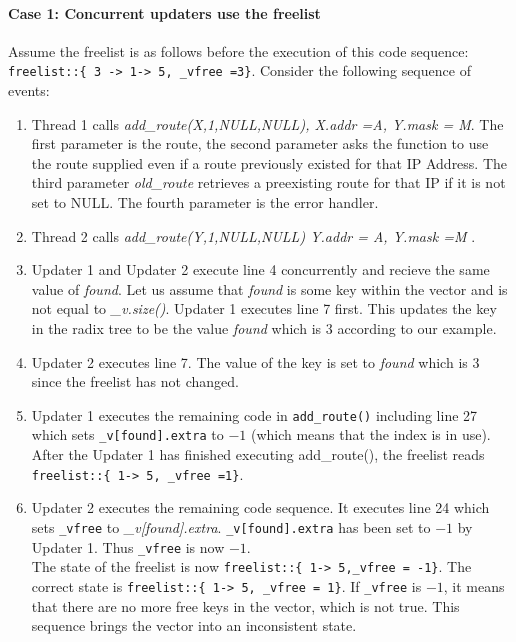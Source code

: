 \documentclass[a4paper,marginparwidth=50pt,marginparsep=10pt]{article}
\begin{document}
\paragraph{Case 1: Concurrent updaters use the freelist}
Assume the freelist is as follows before the execution of this code sequence:\\
\verb$freelist::{ 3 -> 1-> 5, _vfree =3}$. Consider the following sequence of events:
\begin{enumerate}
\item Thread 1 calls \emph{add\_route(X,1,NULL,NULL), X.addr =A, Y.mask = M}. The first parameter is the route, the second parameter asks the function to use the route supplied even if a route previously existed for that IP Address. The third parameter \emph{old\_route} retrieves a preexisting route for that IP if it is not set to NULL. The fourth parameter is the error handler.
\item Thread 2 calls \emph{add\_route(Y,1,NULL,NULL) Y.addr = A, Y.mask =M} .
\item Updater 1 and Updater 2 execute line 4 concurrently and recieve the same value of \emph{found}. Let us assume that \emph{found} is some key within the vector and is not equal to \emph{\_v.size()}. Updater 1 executes line 7 first. This updates the key in the radix tree to be the value \emph{found} which is $3$ according to our example.
\item Updater 2 executes line 7. The value of the key is set to \emph{found} which is $3$ since the freelist has not changed.
\item Updater 1 executes the remaining code in \verb+add_route()+ including line 27 which sets  \verb+_v[found].extra+ to $-1$ (which means that the index is in use). After the Updater 1 has finished executing add\_route(), the freelist reads 
\verb$freelist::{ 1-> 5, _vfree =1}$.
\item Updater 2 executes the remaining code sequence. It executes line 24 which sets \verb+_vfree+ to \emph{\_v[found].extra}. \verb+_v[found].extra+ has been set to $-1$ by Updater 1. Thus \verb+_vfree+ is now $-1$.\\
The state of the freelist is now \verb$freelist::{ 1-> 5,_vfree = -1}$. The correct state is \verb$freelist::{ 1-> 5, _vfree = 1}$. If \verb+_vfree+ is $-1$, it means that there are no more free keys in the vector, which is not true. This sequence brings the vector into an inconsistent state.
\end{enumerate}
\end{document}
